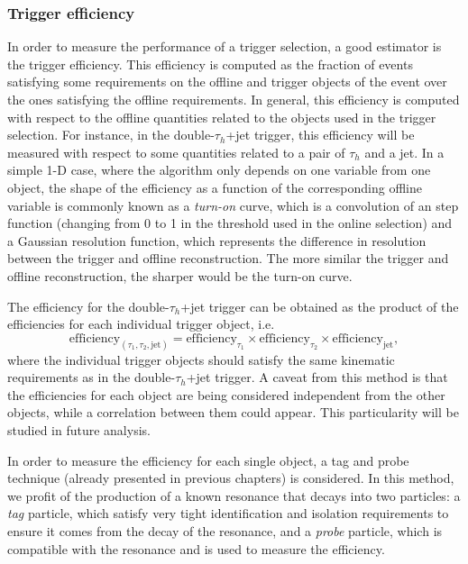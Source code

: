 \documentclass[../main.tex]{subfiles}
\begin{document}
\subsubsection{Trigger efficiency}

In order to measure the performance of a trigger selection, a good estimator is the trigger efficiency. This efficiency is computed as the fraction of events satisfying some requirements on the offline and trigger objects of the event over the ones satisfying the offline requirements. In general, this efficiency is computed with respect to the offline quantities related to the objects used in the trigger selection. For instance, in the double-$\tau_h$+jet trigger, this efficiency will be measured with respect to some quantities related to a pair of $\tau_h$ and a jet. In a simple 1-D case, where the algorithm only depends on one variable from one object, the shape of the efficiency as a function of the corresponding offline variable is commonly known as a \textit{turn-on} curve, which is a convolution of an step function (changing from 0 to 1 in the threshold used in the online selection) and a Gaussian resolution function, which represents the difference in resolution between the trigger and offline reconstruction. The more similar the trigger and offline reconstruction, the sharper would be the turn-on curve.

The efficiency for the double-$\tau_h$+jet trigger can be obtained as the product of the efficiencies for each individual trigger object, i.e.
\begin{equation}
\label{hh:eq:eff_per_legs}
\text{efficiency}_{(\tau_1,\tau_2,\text{jet})} = \text{efficiency}_{\tau_1}\times\text{efficiency}_{\tau_2}\times\text{efficiency}_{\text{jet}},
\end{equation}
where the individual trigger objects should satisfy the same kinematic requirements as in the double-$\tau_h$+jet trigger. A caveat from this method is that the efficiencies for each object are being considered independent from the other objects, while a correlation between them could appear. This particularity will be studied in future analysis.


In order to measure the efficiency for each single object, a tag and probe technique (already presented in previous chapters) is considered. In this method, we profit of the production of a known resonance that decays into two particles: a \textit{tag} particle, which satisfy very tight identification and isolation requirements to ensure it comes from the decay of the resonance, and a \textit{probe} particle, which is compatible with the resonance and is used to measure the efficiency.
\end{document}
